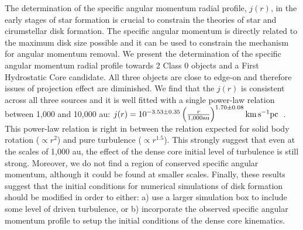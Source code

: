 The determination of the specific angular momentum radial profile, $j(r)$, in the early stages of star formation is crucial to constrain the theories of star and cirumstellar disk formation.
The specific angular momentum is directly related to the maximum disk size possible and 
it can be used to constrain the mechanism for angular momentum removal. 
We present the determination of the specific angular momentum radial profile towards 2 Class 0 objects and a First Hydrostatic Core candidate. 
All three objects are close to edge-on and therefore issues of projection effect are diminished. 
We find that the $j(r)$ is consistent across all three sources and it is well fitted with a single power-law relation between 1,000 and 10,000 au: 
$j(r) = 10^{-3.53\pm 0.35}\left( \frac{r}{1,000 \textrm{au}}\right)^{1.70\pm0.08} \rm{km\, s^{-1} pc}$~.
This power-law relation is right in between the relation expected for solid body rotation ($\propto r^2$) and pure turbulence ($\propto r^{1.5}$). 
This strongly suggest that even at the scales of 1,000 au, the effect of the dense core initial level of turbulence is still strong. 
Moreover, we do not find a region of conserved specific angular momentum, although it could be found at 
smaller scales. 
Finally, these results suggest that the initial conditions for numerical simulations of disk formation 
should be modified in order to either: 
a) use a larger simulation box to include some level of driven turbulence, or 
b) incorporate the observed specific angular momentum profile to setup the initial conditions of the dense core kinematics.